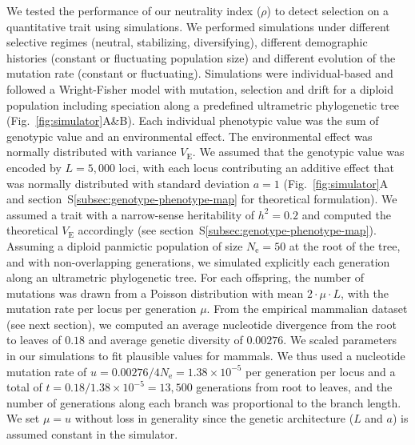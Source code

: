 \documentclass{article}
\newcommand{\Multiply}{\cdot}
\newcommand{\Ne}{N_{\text{e}}}
\newcommand{\Time}{t}
\newcommand{\Heritability}{h^2}
\newcommand{\MutationRatePheno}{\mu}
\newcommand{\MutationRateNuc}{u}
\newcommand{\NbrLoci}{L}
\newcommand{\VarEnv}{V_{\mathrm{E}}}
\newcommand{\NI}{\rho}
\begin{document}
We tested the performance of our neutrality index ($\NI$) to detect selection on a quantitative trait using simulations.
We performed simulations under different selective regimes (neutral, stabilizing, diversifying), different demographic histories (constant or fluctuating population size) and different evolution of the mutation rate (constant or fluctuating).
Simulations were individual-based and followed a Wright-Fisher model with mutation, selection and drift for a diploid population including speciation along a predefined ultrametric phylogenetic tree (Fig.~\ref{fig:simulator}A\&B).
Each individual phenotypic value was the sum of genotypic value and an environmental effect.
The environmental effect was normally distributed with variance $\VarEnv$.
We assumed that the genotypic value was encoded by $\NbrLoci=5,000$ loci, with each locus contributing an additive effect that was normally distributed with standard deviation $a=1$ (Fig.~\ref{fig:simulator}A and section~S\ref{subsec:genotype-phenotype-map} for theoretical formulation).
We assumed a trait with a narrow-sense heritability of $\Heritability=0.2$ and computed the theoretical $\VarEnv$ accordingly (see section~S\ref{subsec:genotype-phenotype-map}).
Assuming a diploid panmictic population of size $\Ne=50$ at the root of the tree, and with non-overlapping generations, we simulated explicitly each generation along an ultrametric phylogenetic tree.
For each offspring, the number of mutations was drawn from a Poisson distribution with mean $2 \Multiply \MutationRatePheno \Multiply \NbrLoci $, with the mutation rate per locus per generation $\MutationRatePheno$.
From the empirical mammalian dataset (see next section), we computed an average nucleotide divergence from the root to leaves of $0.18$ and average genetic diversity of $0.00276$.
We scaled parameters in our simulations to fit plausible values for mammals.
We thus used a nucleotide mutation rate of $\MutationRateNuc=0.00276 / 4 \Ne = 1.38 \times 10^{-5}$ per generation per locus and a total of $\Time = 0.18 / 1.38 \times 10^{-5} = 13,500$ generations from root to leaves, and the number of generations along each branch was proportional to the branch length.
We set $\MutationRatePheno=\MutationRateNuc$ without loss in generality since the genetic architecture ($\NbrLoci$ and $a$) is assumed constant in the simulator.
\end{document}
